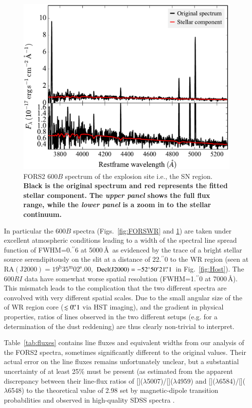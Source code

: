 \documentclass[traditabstract, referee]{aa}
\newcommand{\farc}{\hbox{$.\!\!^{\prime\prime}$}}
\newcommand{\oiii}{[\ion{O}{iii}]}
\newcommand{\nii}{[\ion{N}{ii}]}
\begin{document}
\begin{appendix}
\begin{figure}
\includegraphics[angle=0, width=0.93\columnwidth]{Figs/FORS2_3700_5301_starlight.pdf}
\caption{FORS2 600$B$ spectrum of the explosion site i.e., the SN region. \textbf{Black is the original spectrum and red represents the fitted stellar component. The \textit{upper panel} shows the full flux range, while the \textit{lower panel} is a zoom in to the stellar continuum.}}
\label{fig:FORSSN}
\end{figure}

In particular the 600$B$ spectra (Figs.~\ref{fig:FORSWR} and \ref{fig:FORSSN}) are taken under excellent atmospheric conditions leading to a width of the spectral line spread function of FWHM=0\farc{6} at 5000\,\AA\, as evidenced by the trace of a bright stellar source serendipitously on the slit at a distance of 22\farc{0} to the WR region (seen at $\mathrm{RA(J2000)=19^{h}35^{m}02^{s}.00}$, $\mathrm{Decl(J2000)} = -52^{\circ}50'21\farc{1}$ in Fig.~\ref{fig:Host}). The 600$RI$ data have somewhat worse spatial resolution (FWHM=1\farc{0} at 7000\,\AA). This mismatch leads to the complication that the two different spectra are convolved with very different spatial scales. Due to the small angular size of the of WR region core ($\lesssim 0\farc{1}$ via HST imaging), and the gradient in physical properties, ratios of lines observed in the two different setups (e.g. for a determination of the dust reddening) are thus clearly non-trivial to interpret.

Table~\ref{tab:fluxes} contains line fluxes and equivalent widths from our analysis of the FORS2 spectra, sometimes significantly different to the original \citet{2006A&A...454..103H} values. Their actual error on the line fluxes remains unfortunately unclear, but a substantial uncertainty of at least 25\% must be present (as estimated from the apparent discrepancy between their line-flux ratios of \oiii($\lambda$5007)/\oiii($\lambda$4959) and \nii($\lambda$6584)/\nii($\lambda$6548) to the theoretical value of 2.98 set by magnetic-dipole transition probabilities and observed in high-quality SDSS spectra \citep[e.g.][]{2000MNRAS.312..813S, 2006agna.book.....O, 2016MNRAS.459.3475W}.


\end{appendix}
\end{document}
